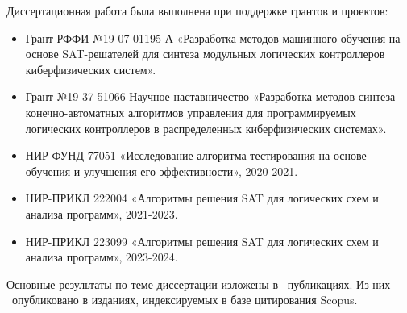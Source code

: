 Диссертационная работа была выполнена при поддержке грантов и проектов:
\begin{itemize}[beginpenalty=10000]
    \item Грант РФФИ №19-07-01195 А «Разработка методов машинного
    обучения на основе SAT-решателей для синтеза модульных логических контроллеров киберфизических систем».
    \item Грант №19-37-51066 Научное наставничество «Разработка методов синтеза конечно-автоматных алгоритмов управления для программируемых логических контроллеров в распределенных киберфизических системах».
    \item НИР-ФУНД 77051 «Исследование алгоритма тестирования на основе обучения и улучшения его эффективности», 2020-2021.
    \item НИР-ПРИКЛ 222004 «Алгоритмы решения SAT для логических схем и анализа программ», 2021-2023.
    \item НИР-ПРИКЛ 223099 «Алгоритмы решения SAT для логических схем и анализа программ», 2023-2024.
\end{itemize}



\publications
Основные результаты по теме диссертации изложены в \theAllMyPapers~публикациях.
Из них
\theScopusPapers~опубликовано в изданиях, индексируемых в базе цитирования Scopus.



